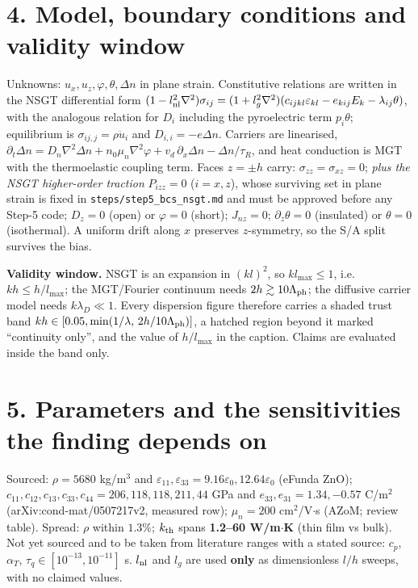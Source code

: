 \documentclass[11pt]{article}
\begin{document}
\section*{4. Model, boundary conditions and validity window}
Unknowns: $u_x,u_z,\varphi,\theta,\Delta n$ in plane strain. Constitutive relations are written in
the NSGT differential form
$(1-l_{\rm nl}^2\nabla^2)\sigma_{ij}=(1+l_g^2\nabla^2)(c_{ijkl}\varepsilon_{kl}-e_{kij}E_k-\lambda_{ij}\theta)$,
with the analogous relation for $D_i$ including the pyroelectric term $p_i\theta$; equilibrium is
$\sigma_{ij,j}=\rho\ddot u_i$ and $D_{i,i}=-e\Delta n$. Carriers are linearised,
$\partial_t\Delta n=D_n\nabla^2\Delta n+n_0\mu_n\nabla^2\varphi+v_d\,\partial_x\Delta n-\Delta n/\tau_R$,
and heat conduction is MGT with the thermoelastic coupling term. Faces $z=\pm h$ carry:
$\sigma_{zz}=\sigma_{xz}=0$; \emph{plus the NSGT higher-order traction} $P_{izz}=0$ ($i=x,z$), whose
surviving set in plane strain is fixed in \texttt{steps/step5\_bcs\_nsgt.md} and must be approved
before any Step-5 code; $D_z=0$ (open) or $\varphi=0$ (short); $J_{nz}=0$; $\partial_z\theta=0$
(insulated) or $\theta=0$ (isothermal). A uniform drift along $x$ preserves $z$-symmetry, so the
S/A split survives the bias.

\textbf{Validity window.} NSGT is an expansion in $(kl)^2$, so $kl_{\max}\le1$, i.e.\
$kh\le h/l_{\max}$; the MGT/Fourier continuum needs $2h\gtrsim10\Lambda_{\rm ph}$; the diffusive
carrier model needs $k\lambda_D\ll1$. Every dispersion figure therefore carries a shaded trust band
$kh\in[0.05,\min(1/\lambda,\,2h/10\Lambda_{\rm ph})]$, a hatched region beyond it marked
``continuity only'', and the value of $h/l_{\max}$ in the caption. Claims are evaluated inside the
band only.

\section*{5. Parameters and the sensitivities the finding depends on}
Sourced: $\rho=5680$ kg/m$^3$ and $\varepsilon_{11},\varepsilon_{33}=9.16\varepsilon_0,12.64\varepsilon_0$
(eFunda ZnO); $c_{11},c_{12},c_{13},c_{33},c_{44}=206,118,118,211,44$ GPa and
$e_{33},e_{31}=1.34,-0.57$ C/m$^2$ (arXiv:cond-mat/0507217v2, measured row);
$\mu_n=200$ cm$^2$/V$\cdot$s (AZoM; review table). Spread: $\rho$ within $1.3\%$;
$k_{\rm th}$ spans \textbf{1.2--60 W/m$\cdot$K} (thin film vs bulk).
Not yet sourced and to be taken from literature ranges with a stated source:
$c_p$, $\alpha_T$, $\tau_q\in[10^{-13},10^{-11}]$ s. $l_{\rm nl}$ and $l_g$ are used
\textbf{only} as dimensionless $l/h$ sweeps, with no claimed values.
\end{document}
